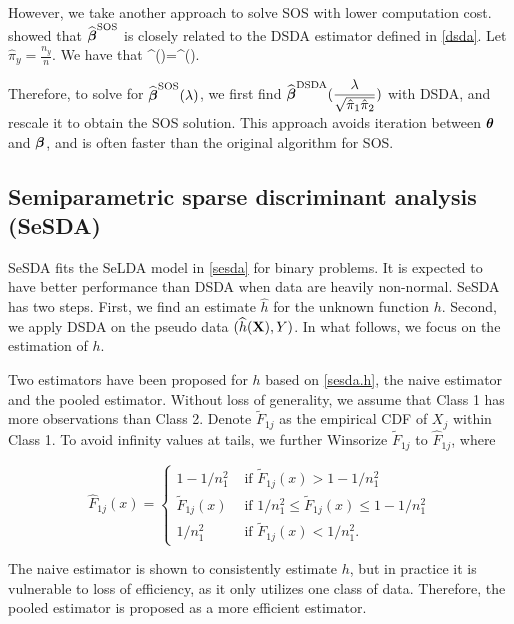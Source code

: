 However, we take another approach to solve SOS with lower computation cost. \cite{Mai2013note} showed that $\widehat{\boldsymbol{\beta}}^{\text{SOS}}$ is closely related to the DSDA estimator defined in \eqref{dsda}. Let $\hat{\pi}_y=\frac{n_y}{n}$. We have that
\beq
\widehat{\bolbeta}^{}(\lambda)=\widehat{\bolbeta}^{}().
\eeq

Therefore, to solve for $\widehat{\boldsymbol{\beta}}^{\text{SOS}}(\lambda)$, we first find $\widehat{\boldsymbol{\beta}}^{\text{DSDA}}(\dfrac{\lambda}{\sqrt{\hat{\pi}_1\hat{\pi}_2}})$ with DSDA, and rescale it to obtain the SOS solution. This approach avoids iteration between $\boldsymbol{\theta}$ and $\boldsymbol{\beta}$, and is often faster than the original algorithm for SOS. 



\subsection{Semiparametric sparse discriminant analysis (SeSDA)}\label{Sec: SeSDA}

SeSDA \citep{Mai2015ssda} fits the SeLDA model in \eqref{sesda} for binary problems. It is expected to have better performance than DSDA when data are heavily non-normal. SeSDA has two steps. First, we find an estimate $\widehat{h}$ for the unknown function $h$. Second, we apply DSDA on the pseudo data $(\widehat{h}(\mathbf{X}),Y)$. In what follows, we focus on the estimation of $h$. 


Two estimators have been proposed for $h$ based on \eqref{sesda.h}, the naive estimator and the pooled estimator. Without loss of generality, we assume that Class 1 has more observations than Class 2. Denote $\tilde{F}_{1j}$ as the empirical CDF of $X_j$ within Class 1.
To avoid infinity values at tails, we further Winsorize $\tilde{F}_{1j}$ to $\hat F_{1j}$, where

\[
\hat{F}_{1j}(x)=\left\{
\begin{array}{ll}
1-1/n_1^2 &\textrm{ if } \tilde{F}_{1j}(x)>1-1/n_1^2\\
\tilde{F}_{1j}(x) &\textrm{ if } 1/n_1^2\leq \tilde{F}_{1j}(x)\leq 1-1/n_1^2 \\
1/n_1^2 &\textrm{ if } \tilde{F}_{1j}(x)<1/n_1^2.
\end{array}
\right.
\]


The naive estimator is shown to consistently estimate $h$, but in practice it is vulnerable to loss of efficiency, as it only utilizes one class of data. Therefore, the pooled estimator is proposed as a more efficient estimator. 

